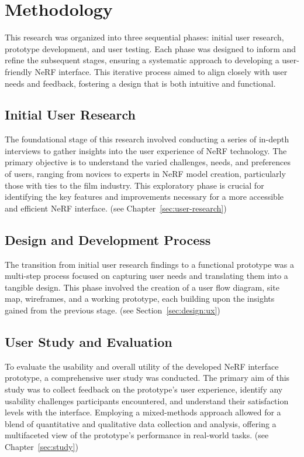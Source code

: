 %
\chapter{Methodology}
\label{sec:methodology}

This research was organized into three sequential phases: initial user research, prototype development, and user testing. 
Each phase was designed to inform and refine the subsequent stages, ensuring a systematic approach to developing a user-friendly NeRF interface. 
This iterative process aimed to align closely with user needs and feedback, fostering a design that is both intuitive and functional.

\section{Initial User Research}
\label{sec:methodology:user-research}

The foundational stage of this research involved conducting a series of in-depth interviews to gather insights into the user experience of NeRF technology. 
The primary objective is to understand the varied challenges, needs, and preferences of users, ranging from novices to experts in NeRF model creation, particularly those with ties to the film industry. 
This exploratory phase is crucial for identifying the key features and improvements necessary for a more accessible and efficient NeRF interface. (see Chapter~\ref{sec:user-research})

\section{Design and Development Process}
\label{sec:methodology:design-development}

The transition from initial user research findings to a functional prototype was a multi-step process focused on capturing user needs and translating them into a tangible design. 
This phase involved the creation of a user flow diagram, site map, wireframes, and a working prototype, each building upon the insights gained from the previous stage. (see Section~\ref{sec:design:ux})

\section{User Study and Evaluation}
\label{sec:methodology:study}

To evaluate the usability and overall utility of the developed NeRF interface prototype, a comprehensive user study was conducted. 
The primary aim of this study was to collect feedback on the prototype's user experience, identify any usability challenges participants encountered, and understand their satisfaction levels with the interface. 
Employing a mixed-methods approach allowed for a blend of quantitative and qualitative data collection and analysis, offering a multifaceted view of the prototype's performance in real-world tasks. (see Chapter~\ref{sec:study})